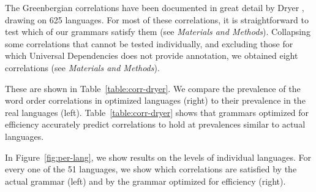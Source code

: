 \documentclass[9pt,twocolumn,twoside,lineno]{pnas-new}
\begin{document}
The Greenbergian correlations have been documented in great detail by Dryer \cite{dryer1992greenbergian}, drawing on 625 languages.
For most of these correlations, it is straightforward to test which of our grammars satisfy them (see \textit{Materials and Methods}).
Collapsing some correlations that cannot be tested individually, and excluding those for which Universal Dependencies does not provide annotation, we obtained eight correlations  (see \textit{Materials and Methods}).

These are shown in Table~\ref{table:corr-dryer}.
We compare the prevalence of the word order correlations in optimized languages (right) to their prevalence in the real languages (left).
Table~\ref{table:corr-dryer} shows that grammars optimized for efficiency accurately predict correlations to hold at prevalences similar to actual languages.

In Figure~\ref{fig:per-lang}, we show results on the levels of individual languages.
For every one of the 51 languages, we show which correlations are satisfied by the actual grammar (left) and by the grammar optimized for efficiency (right).
\end{document}
